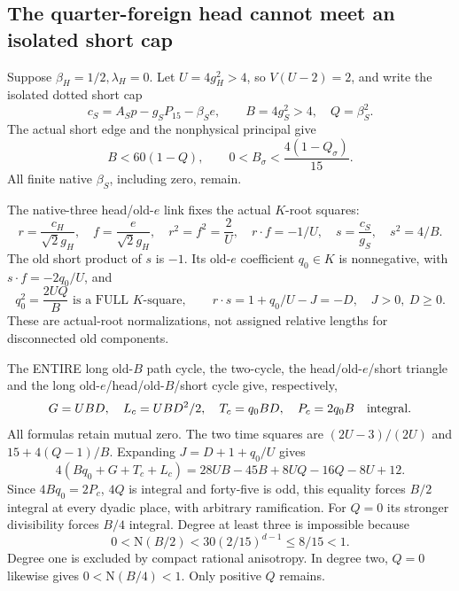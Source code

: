 \documentclass[11pt]{article}
\begin{document}
\subsection{The quarter-foreign head cannot meet an isolated short cap}
\label{app:arithB15Iquarter}

Suppose \(\beta_H=1/2,\lambda_H=0\).
Let \(U=4g_H^2>4\), so \(V(U-2)=2\), and write the
isolated dotted short cap
\[
 c_S=A_Sp-g_SP_{15}-\beta_Se,\qquad
 B=4g_S^2>4,\quad Q=\beta_S^2.
\]
The actual short edge and the nonphysical principal give
\[
 B<60(1-Q),\qquad
 0<B_\sigma<{\frac{4(1-Q_\sigma)}{15}}.
\]
All finite native \(\beta_S\), including zero, remain.

The native-three head/old-\(e\) link fixes the actual
\(K\)-root squares:
\[
 r={\frac{c_H}{\sqrt2g_H}},\quad f={\frac{e}{\sqrt2g_H}},
 \quad r^2=f^2={\frac{2}{U}},\quad r\cdot f=-1/U,\quad
 s={\frac{c_S}{g_S}},\quad s^2=4/B .
\]
The old short product of \(s\) is \(-1\).
Its old-\(e\) coefficient \(q_0\in K\) is nonnegative,
with \(s\cdot f=-2q_0/U\), and
\[
 q_0^2={\frac{2UQ}{B}}\text{ is a FULL }K\text{-square},\qquad
 r\cdot s=1+q_0/U-J=-D,\quad J>0,\ D\ge0 .
\]
These are actual-root normalizations, not assigned
relative lengths for disconnected old components.

The ENTIRE long old-\(B\) path cycle, the two-cycle,
the head/old-\(e\)/short triangle and the long
old-\(e\)/head/old-\(B\)/short cycle give, respectively,
\[
              G=UBD,\quad L_c=UBD^2/2,\quad
              T_c=q_0BD,\quad P_c=2q_0B
                         \quad\hbox{integral}.
\]
All formulas retain mutual zero.
The two time squares are
\((2U-3)/(2U)\) and \(15+4(Q-1)/B\).
Expanding \(J=D+1+q_0/U\) gives
\[
 4(Bq_0+G+T_c+L_c)
       =28UB-45B+8UQ-16Q-8U+12 .
\tag{BQ2}\label{eq:arithB15Iquarterparity}
\]
Since \(4Bq_0=2P_c\), \(4Q\) is integral and
forty-five is odd, this equality forces \(B/2\)
integral at every dyadic place, with arbitrary
ramification.
For \(Q=0\) its stronger divisibility forces \(B/4\)
integral.
Degree at least three is impossible because
\[
                 0<\mathrm N(B/2)
                       <30(2/15)^{d-1}\le8/15<1 .
\]
Degree one is excluded by compact rational anisotropy.
In degree two, \(Q=0\) likewise gives
\(0<\mathrm N(B/4)<1\).
Only positive \(Q\) remains.
\end{document}

